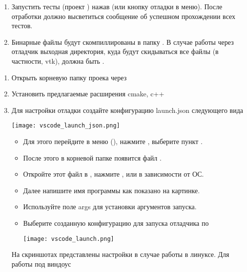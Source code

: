 \begin{enumerate}
\item
Запустить тесты (проект ) нажав  (или кнопку отладки в меню).
После отработки должно высветиться сообщение об успешном прохождении всех тестов.

\item
Бинарные файлы будут скомпиллированы в папку .
В случае работы через отладчик выходная директория, куда будут скидываться все файлы (в частности, vtk),
должна быть .
\end{enumerate}

\label{sec:vscode-build}

\begin{enumerate}
\item
Открыть корневую папку проека через 
\item
Установить предлагаемые расширения cmake, c++
\item
Для настройки отладки создайте конфигурацию launch.json следующего вида
\begin{center}
\texttt{[image: vscode\_launch\_json.png]}
\end{center}
\begin{itemize}
\item
Для этого перейдите в меню  (), нажмите
, выберите пункт .
\item
После этого в корневой папке появится файл .
\item
Откройте этот файл в , нажмите ,  или  в зависимости от ОС.
\item
Далее напишите имя программы как показано на картинке.
\item
Используйте поле args для установки аргументов запуска.
\item
Выберите созданную конфигурацию для запуска отладчика по 
\begin{center}
\texttt{[image: vscode\_launch.png]}
\end{center}
\end{itemize}

На скриншотах представлены настройки в случае работы в линуксе. Для работы под виндоус 
\end{enumerate}

